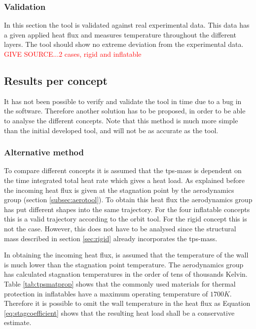 \subsubsection{Validation}
In this section the tool is validated against real experimental data. This data has a given applied heat flux and measures temperature throughout the different layers. The tool should show no extreme deviation from the experimental data. \textcolor{red}{GIVE SOURCE...2 cases, rigid and inflatable}


\subsection{Results per concept}
It has not been possible to verify and validate the tool in time due to a bug in the software. Therefore another solution has to be proposed, in order to be able to analyse the different concepts. Note that this method is much more simple than the initial developed tool, and will not be as accurate as the tool. 

\subsubsection{Alternative method}
To compare different concepts it is assumed that the \gls{tps}-mass is dependent on the time integrated total heat rate which gives a heat load. As explained before the incoming heat flux is given at the stagnation point by the aerodynamics group (section \ref{subsec:aerotool}). To obtain this heat flux the aerodynamics group has put different shapes into the same trajectory. For the four inflatable concepts this is a valid trajectory according to the orbit tool. For the rigid concept this is not the case. However, this does not have to be analysed since the structural mass described in section \ref{sec:rigid} already incorporates the \gls{tps}-mass.

In obtaining the incoming heat flux, is assumed that the temperature of the wall is much lower than the stagnation point temperature. The aerodynamics group has calculated stagnation temperatures in the order of tens of thousands Kelvin. Table \ref{tab:tpsmatprop} shows that the commonly used materials for thermal protection in inflatables have a maximum operating temperature of $1700K$. Therefore it is possible to omit the wall temperature in the heat flux as Equation \eqref{eq:stagcoefficient} shows that the resulting heat load shall be a conservative estimate. 

